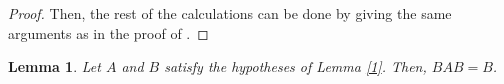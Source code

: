 \documentclass[notitlepage,12pt,reqno]{amsart}
\newtheorem{lem}[thm]{Lemma}
\numberwithin{equation}{section}
\begin{document}
\begin{proof}
Then, the rest of the calculations can be done by giving the same arguments as in the proof of \cite[Theorem 2.8]{nandi}.
\end{proof}
\begin{lem}\label{3}
Let $A$ and $B$ satisfy the hypotheses of Lemma \ref{1}. Then, $BAB = B$.
\end{lem}
\end{document}
